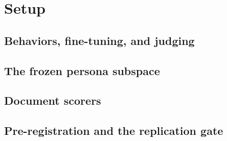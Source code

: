\section{Setup}
\label{sec:setup}

\subsection{Behaviors, fine-tuning, and judging}
\label{sec:setup-behaviors}


\subsection{The frozen persona subspace}
\label{sec:setup-subspace}


\subsection{Document scorers}
\label{sec:setup-scorers}


\subsection{Pre-registration and the replication gate}
\label{sec:setup-prereg}

